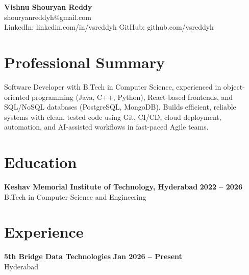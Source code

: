 \documentclass[a4paper,11pt]{article}
\newcommand{\resumeSubheading}[4]{%
  \textbf{#1} \hfill \textbf{#2} \\
{#3} \hfill {#4}
}
\begin{document}
\pagestyle{empty}
\raggedbottom
\addtolength{\textheight}{2\baselineskip}
\small

\begin{center}
  {\LARGE \textbf{Vishnu Shouryan Reddy}}\\[0.3em]
  shouryanreddyh@gmail.com \\[0.3em]
  LinkedIn: linkedin.com/in/vsreddyh \textbar{} GitHub: github.com/vsreddyh
\end{center}
\vspace{-0.8em}

\section*{Professional Summary}

Software Developer with B.Tech in Computer Science, experienced in object-oriented programming (Java, C++, Python), React-based frontends, and SQL/NoSQL databases (PostgreSQL, MongoDB). Builds efficient, reliable systems with clean, tested code using Git, CI/CD, cloud deployment, automation, and AI-assisted workflows in fast-paced Agile teams.
\section*{Education}

\resumeSubheading
{Keshav Memorial Institute of Technology, Hyderabad}{2022 -- 2026}
{B.Tech in Computer Science and Engineering}{}


\section*{Experience}

\resumeSubheading
{5th Bridge Data Technologies}{Jan 2026 -- Present}
{Hyderabad}{}
\end{document}
